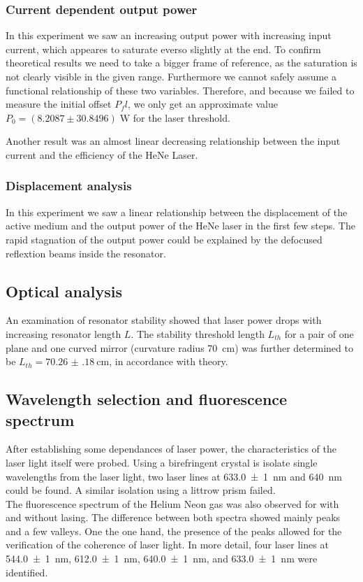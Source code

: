 \documentclass[../main.tex]{subfiles}
\begin{document}
    \subsubsection*{Current dependent output power}
        In this experiment we saw an increasing output power with increasing input current, which appeares to saturate everso slightly at the end. To confirm theoretical results we need to take a bigger frame of reference, as the saturation is not clearly visible in the given range. Furthermore we cannot safely assume a functional relationship of these two variables. Therefore, and because we failed to measure the initial offset $P_fl$, we only get an approximate value $P_0 = (8.2087\pm 30.8496)\;\si{\W}$ for the laser threshold.

        Another result was an almost linear decreasing relationship between the input current and the efficiency of the HeNe Laser. 

    \subsubsection*{Displacement analysis}
        In this experiment we saw a linear relationship between the displacement of the active medium and the output power of the HeNe laser in the first few steps. The rapid stagnation of the output power could be explained by the defocused reflextion beams inside the resonator. 


    \subsection{Optical analysis}
        An examination of resonator stability showed that laser power drops with increasing resonator length $L$. The stability threshold length $L_{th}$ for a pair of one plane and one curved mirror (curvature radius \SI{70}{\cm}) was further determined to be $L_{th} = \SI{70.26(18)}{\cm}$, in accordance with theory.

    \subsection{Wavelength selection and fluorescence spectrum}
        After establishing some dependances of laser power, the characteristics of the laser light itself were probed. Using a birefringent crystal is isolate single wavelengths from the laser light, two laser lines at \SI{633.0(10)}{\nm} and \SI{640}{\nm} could be found. A similar isolation using a littrow prism failed.\\
        
        \noindent The fluorescence spectrum of the Helium Neon gas was also observed for with and without lasing. The difference between both spectra showed mainly peaks and a few valleys. One the one hand, the presence of the peaks allowed for the verification of the coherence of laser light. In more detail, four laser lines at \SI{544.0(10)}{\nm}, \SI{612.0(10)}{\nm}, \SI{640.0(10)}{\nm}, and \SI{633.0(10)}{\nm} were identified.
\end{document}
